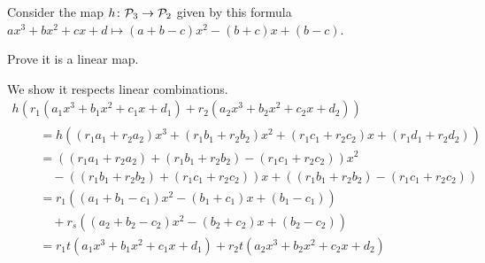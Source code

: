 \documentclass[11pt,answers]{examjh}
\begin{document}
\begin{questions}
\question
Consider the map $\mbox{$h\colon \mathcal{P}_3\to \mathcal{P}_2$}$
given by this formula
$ax^3+bx^2+cx+d \mapsto (a+b-c)x^2-(b+c)x+(b-c)$.
\begin{parts}
\item Prove it is a linear map.
\begin{solution}[2.25in]
We show it respects linear combinations.
\begin{multline*}
  h(r_1(a_1x^3+b_1x^2+c_1x+d_1)+r_2(a_2x^3+b_2x^2+c_2x+d_2))              \\ 
  \begin{split} \quad 
  &=h((r_1a_1+r_2a_2)x^3+(r_1b_1+r_2b_2)x^2+(r_1c_1+r_2c_2)x+(r_1d_1+r_2d_2))   \\
  &=((r_1a_1+r_2a_2)+(r_1b_1+r_2b_2)-(r_1c_1+r_2c_2))x^2  \\
  &\quad -((r_1b_1+r_2b_2)+(r_1c_1+r_2c_2))x
  +((r_1b_1+r_2b_2)-(r_1c_1+r_2c_2))        \\
  &=r_1((a_1+b_1-c_1)x^2-(b_1+c_1)x+(b_1-c_1))   \\
  &\quad +r_s((a_2+b_2-c_2)x^2-(b_2+c_2)x+(b_2-c_2))        \\
  &=r_1t(a_1x^3+b_1x^2+c_1x+d_1)+r_2t(a_2x^3+b_2x^2+c_2x+d_2)
  \end{split}
\end{multline*}
\end{solution}


\end{parts}
\end{questions}
\end{document}
